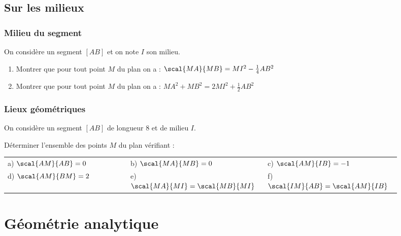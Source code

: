 \documentclass[oneside,12pt]{book}          %
\begin{document}
\section{Sur les milieux}

\subsection{Milieu du segment}

On considère un segment $[AB]$ et on note $I$ son milieu.

\begin{enumerate}
    \item Montrer que pour tout point $M$ du plan on a : $\scal{MA}{MB}=MI^2-\frac{1}{4}AB^2$
    \item Montrer que pour tout point $M$ du plan on a : $MA^2+MB^2=2MI^2+\frac{1}{2}AB^2$
\end{enumerate}



\subsection{Lieux géométriques}
On considère un segment $[AB]$ de longueur 8 et de milieu $I$.

Déterminer l'ensemble des points $M$ du plan vérifiant :\\[5pt]
\begin{tabular}{p{0.3\linewidth} p{0.3\linewidth} p{0.3\linewidth}}
    a) $\scal{AM}{AB}=0$ & b) $\scal{MA}{MB}=0$ & c) $\scal{AM}{IB}=-1$ \\
    d) $\scal{AM}{BM}=2$ & e) $\scal{MA}{MI}=\scal{MB}{MI}$ & f) $\scal{IM}{AB}=\scal{AM}{IB}$
\end{tabular}


\chapter{Géométrie analytique}
\newpage
\end{document}
